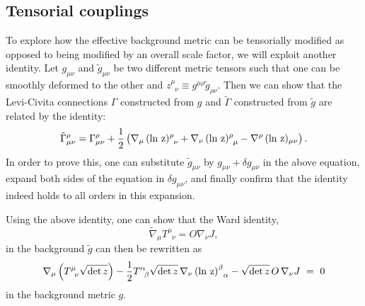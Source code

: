 \documentclass[prd,reprint,a4paper,showpacs,superscriptaddress,11pt,onecolumn,nofootinbib]{revtex4-1}
\renewcommand{\(}{\left(}
\renewcommand{\)}{\right)}
\newcommand{\6}{\partial}
\begin{document}
\subsection{Tensorial couplings}
To explore how the effective background metric can be tensorially modified as opposed to being modified by an overall scale factor, we will exploit another identity. Let $g_{\mu\nu}$ and $\tilde{g}_{\mu\nu}$ be two different metric tensors such that one can be smoothly deformed to the other and $z^\mu_{\phantom{\mu}\nu} \equiv g^{\mu\rho}\tilde{g}_{\rho\nu}$. Then we can show that the Levi-Civita connections $\Gamma$ constructed from $g$ and $\tilde\Gamma$ constructed from $\tilde g$ are related by the identity:
\begin{equation}
\tilde{\Gamma}^\rho_{\mu\nu} = \Gamma^\rho_{\mu\nu} + \frac{1}{2}\left(\nabla_\mu \,({\rm \ln \, z})^\rho_{\phantom{\rho} \nu} + \nabla_\nu \,({\rm \ln \, z})^\rho_{\phantom{\rho} \mu}-\nabla^\rho \,({\rm \ln \, z})_{\mu \nu}\right).
\end{equation}
In order to prove this, one can substitute $\tilde{g}_{\mu\nu}$ by  $g_{\mu\nu}+ \delta g_{\mu\nu}$ in the above equation, expand both sides of the equation in $\delta g_{\mu\nu}$, and finally confirm that the identity indeed holds to all orders in this expansion.

Using the above identity, one can show that the Ward identity,
\begin{equation}
\tilde{\nabla}_\mu T^\mu_{\phantom{\mu}\nu} = O \nabla_\nu J,
\end{equation}
in the background $\tilde{g}$ can then be rewritten as
\begin{equation}
\nabla_\mu \left(T^\mu_{\phantom{\mu}\nu} \sqrt{{\rm det}\, z}\right) - \dfrac{1}{2} T^\alpha_{\phantom{\alpha}\beta} \sqrt{{\rm det} \, z} \, \nabla_\nu \left({\rm \ln \, z}\right)^\beta_{\phantom{\alpha} \alpha} - \sqrt{{\rm det} \, z} \, O \, \nabla_\nu J ~ = ~ 0
\end{equation}
in the background metric $g$.
\end{document}
